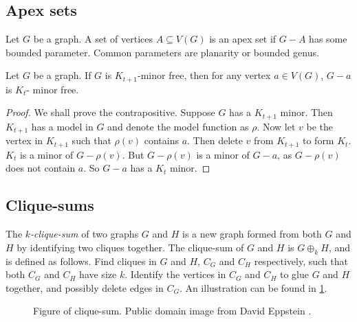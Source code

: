 \subsection{Apex sets}\label{sssec:Apex_Vertices}
Let $G$ be a graph. A set of vertices $A \subseteq V(G)$ is an apex set if $G - A$ has some bounded parameter. Common parameters are planarity or bounded genus. 
\begin{theorem}
	Let $G$ be a graph. If \(G\) is \(K_{t + 1}\)-minor free, then for any vertex $a \in V(G)$, $G - a$ is \(K_t\)- minor free. 
\end{theorem}
\begin{proof}
	We shall prove the contrapositive. Suppose \(G\) has a \(K_{t + 1}\) minor. Then \(K_{t + 1}\) has a model in \(G\) and denote the model function as \(\rho\). Now let \(v\) be the vertex in \(K_{t + 1}\) such that \(\rho(v)\) contains \(a\). Then delete \(v\) from \(K_{t + 1}\) to form $K_t$. \(K_t\) is a minor of \(G - \rho(v)\). But \(G - \rho(v)\) is a minor of \(G - a\), as \(G - \rho(v)\) does not contain \(a\). So \(G - a\) has a \(K_t\) minor. 
\end{proof}
\subsection{Clique-sums}\label{sssec:Clique_Sums}
The \textit{\(k\)-clique-sum} of two graphs \(G\) and \(H\) is a new graph formed from both $G$ and $H$ by identifying two cliques together. The clique-sum of $G$ and $H$ is \(G \oplus_k H\), and is defined as follows. Find cliques in \(G\) and \(H\), \(C_G\) and \(C_H\) respectively, such that both \(C_G\) and \(C_H\) have size \(k\). Identify the vertices in \(C_G\) and \(C_H\) to glue \(G\) and \(H\) together, and possibly delete edges in $C_G$. An illustration can be found in \cref{fig:clique-sum}. 

\begin{figure}[h]
	\centering
	
	\caption{Figure of clique-sum. Public domain image from David Eppstein \cite{eppsteinCliquesum2023}.}
	\label{fig:clique-sum}
\end{figure}


